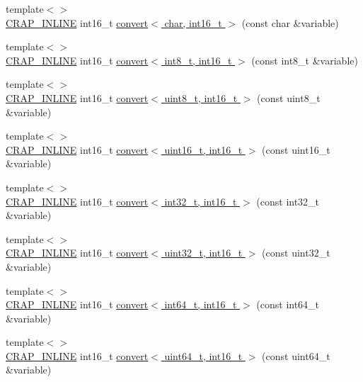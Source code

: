 \begin{DoxyCompactItemize}
\item 
{\footnotesize template$<$$>$ }\\\hyperlink{config__x86_8h_a5a40526b8d842e7ff731509998bb0f1c}{C\+R\+A\+P\+\_\+\+I\+N\+L\+I\+N\+E} int16\+\_\+t \hyperlink{namespacecrap_ade4b66d735b9f9c83173ccf7373f29a4}{convert$<$ char, int16\+\_\+t $>$} (const char \&variable)
\item 
{\footnotesize template$<$$>$ }\\\hyperlink{config__x86_8h_a5a40526b8d842e7ff731509998bb0f1c}{C\+R\+A\+P\+\_\+\+I\+N\+L\+I\+N\+E} int16\+\_\+t \hyperlink{namespacecrap_aaa8b97e3e1833faa04052dec57cdab84}{convert$<$ int8\+\_\+t, int16\+\_\+t $>$} (const int8\+\_\+t \&variable)
\item 
{\footnotesize template$<$$>$ }\\\hyperlink{config__x86_8h_a5a40526b8d842e7ff731509998bb0f1c}{C\+R\+A\+P\+\_\+\+I\+N\+L\+I\+N\+E} int16\+\_\+t \hyperlink{namespacecrap_a19fce08e3c9a7fa894b2c81264385f7e}{convert$<$ uint8\+\_\+t, int16\+\_\+t $>$} (const uint8\+\_\+t \&variable)
\item 
{\footnotesize template$<$$>$ }\\\hyperlink{config__x86_8h_a5a40526b8d842e7ff731509998bb0f1c}{C\+R\+A\+P\+\_\+\+I\+N\+L\+I\+N\+E} int16\+\_\+t \hyperlink{namespacecrap_a2ff21dbacf45a7c74acccb8b5a4f4e82}{convert$<$ uint16\+\_\+t, int16\+\_\+t $>$} (const uint16\+\_\+t \&variable)
\item 
{\footnotesize template$<$$>$ }\\\hyperlink{config__x86_8h_a5a40526b8d842e7ff731509998bb0f1c}{C\+R\+A\+P\+\_\+\+I\+N\+L\+I\+N\+E} int16\+\_\+t \hyperlink{namespacecrap_a12c0482101fcf69cc2c08ff7ea4def09}{convert$<$ int32\+\_\+t, int16\+\_\+t $>$} (const int32\+\_\+t \&variable)
\item 
{\footnotesize template$<$$>$ }\\\hyperlink{config__x86_8h_a5a40526b8d842e7ff731509998bb0f1c}{C\+R\+A\+P\+\_\+\+I\+N\+L\+I\+N\+E} int16\+\_\+t \hyperlink{namespacecrap_a97c7e2b5d83d96a3bec0dd8731efe1db}{convert$<$ uint32\+\_\+t, int16\+\_\+t $>$} (const uint32\+\_\+t \&variable)
\item 
{\footnotesize template$<$$>$ }\\\hyperlink{config__x86_8h_a5a40526b8d842e7ff731509998bb0f1c}{C\+R\+A\+P\+\_\+\+I\+N\+L\+I\+N\+E} int16\+\_\+t \hyperlink{namespacecrap_ab3e1f6d24576fc674876a8f01b927a38}{convert$<$ int64\+\_\+t, int16\+\_\+t $>$} (const int64\+\_\+t \&variable)
\item 
{\footnotesize template$<$$>$ }\\\hyperlink{config__x86_8h_a5a40526b8d842e7ff731509998bb0f1c}{C\+R\+A\+P\+\_\+\+I\+N\+L\+I\+N\+E} int16\+\_\+t \hyperlink{namespacecrap_a02b0d31900213a4f454dbe387eb09c9d}{convert$<$ uint64\+\_\+t, int16\+\_\+t $>$} (const uint64\+\_\+t \&variable)

\end{DoxyCompactItemize}
